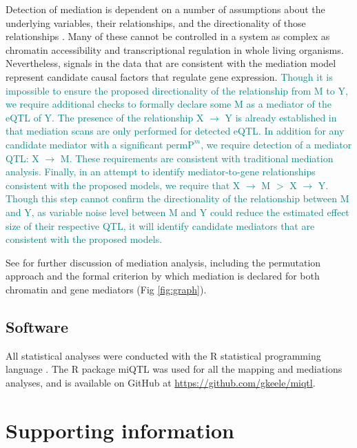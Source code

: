 \documentclass[10pt,letterpaper]{article}
\newcommand{\permpmed}{\text{permP}^{m}}
\newcommand{\GKinline}[1]{\textcolor{teal}{#1}}
\begin{document}
Detection of mediation is dependent on a number of assumptions about the underlying variables, their relationships, and the directionality of those relationships \cite{Mackinnon2007}. Many of these cannot be controlled in a system as complex as chromatin accessibility and transcriptional regulation in whole living organisms. Nevertheless, signals in the data that are consistent with the mediation model represent candidate causal factors that regulate gene expression. 
\GKinline{Though it is impossible to ensure the proposed directionality of the relationship from M to Y, we require additional checks to formally declare some M as a mediator of the eQTL of Y. The presence of the relationship X $\rightarrow$ Y is already established in that mediation scans are only performed for detected eQTL. In addition for any candidate mediator with a significant $\permpmed$, we require detection of a mediator QTL: X $\rightarrow$ M. These requirements are consistent with traditional mediation analysis. Finally, in an attempt to identify mediator-to-gene relationships consistent with the proposed models, we require that X $\rightarrow$ M $>$ X $\rightarrow$ Y. Though this step cannot confirm the directionality of the relationship between M and Y, as variable noise level between M and Y could reduce the estimated effect size of their respective QTL, it will identify candidate mediators that are consistent with the proposed models.}

See  for further discussion of mediation analysis, including the permutation approach and the formal criterion by which mediation is declared for both chromatin and gene mediators (Fig \ref{fig:graph}).

\subsection*{Software}

All statistical analyses were conducted with the R statistical programming language \cite{RSoftware2019}. The R package miQTL was used for all the mapping and mediations analyses, and is available on GitHub at \url{https://github.com/gkeele/miqtl}.

\section*{Supporting information}

\end{document}
